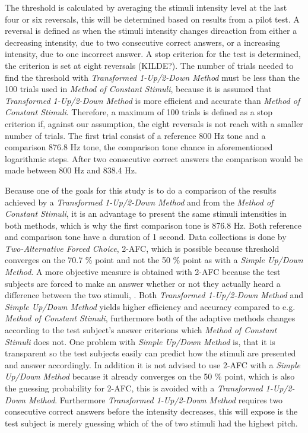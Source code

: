 \noindent
%
The threshold is calculated by averaging the stimuli intensity level at the last four or six reversals, this will be determined based on results from a pilot test. A reversal is defined as when the stimuli intensity changes direaction from either a decreasing intensity, due to two consecutive correct answers, or a increasing intensity, due to one incorrect answer. A stop criterion for the test is determined, the criterion is set at eight reversals (KILDE?). The number of trials needed to find the threshold with  \textit{Transformed 1-Up/2-Down Method} must be less than the 100 trials used in \textit{Method of Constant Stimuli}, because it is assumed that \textit{Transformed 1-Up/2-Down Method} is more efficient and accurate than \textit{Method of Constant Stimuli}. Therefore, a maximum of 100 trials is defined as a stop criterion if, against our assumption, the eight reversals is not reach with a smaller number of trials. The first trial consist of a reference 800 Hz tone and a comparison 876.8 Hz tone, the comparison tone chance in aforementioned logarithmic steps. After two consecutive correct answers the comparison would be made between 800 Hz and 838.4 Hz.

Because one of the goals for this study is to do a comparison of the results achieved by a \textit{Transformed 1-Up/2-Down Method} and from the \textit{Method of Constant Stimuli}, it is an advantage to present the same stimuli intensities in both methods, which is why the first comparison tone is 876.8 Hz. Both reference and comparison tone have a duration of 1 second.\blankline
%               
Data collections is done by \textit{Two-Alternative Forced Choice}, 2-AFC, which is possible because threshold converges on the 70.7 \% point and not the 50 \% point as with a \textit{Simple Up/Down Method}. A more objective measure is obtained with 2-AFC because the test subjects are forced to make an answer whether or not they actually heard a difference between the two stimuli, \parencite[p. 1219]{PDF:PsyphyMethods}.\blankline 
%
Both \textit{Transformed 1-Up/2-Down Method} and \textit{Simple Up/Down Method} yields higher efficiency and accuracy compared to e.g. \textit{Method of Constant Stimuli}, furthermore both of the adaptive methods changes according to the test subject's answer criterions which \textit{Method of Constant Stimuli} does not. One problem with \textit{Simple Up/Down Method} is, that it is transparent so the test subjects easily can predict how the stimuli are presented and answer accordingly. In addition it is not advised to use 2-AFC with a \textit{Simple Up/Down Method} because it already converges on the 50 \% point, which is also the guessing probability for 2-AFC, this is avoided with a \textit{Transformed 1-Up/2-Down Method}. Furthermore \textit{Transformed 1-Up/2-Down Method} requires two consecutive correct answers before the intensity decreases, this will expose is the test subject is merely guessing which of the of two stimuli had the highest pitch. 

